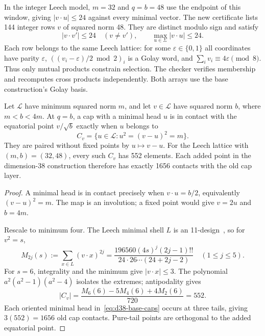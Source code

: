 In the integer Leech model, $m=32$ and $q=b=48$ use the endpoint of
this window, giving $|v\cdot u|\le24$ against every minimal vector.
The new certificate lists 144 integer rows $v$ of squared norm
48. They are distinct modulo sign and satisfy
\begin{equation}\label{eq:d38-witness}
 |v\cdot v'|\le24\quad(v\ne v'),\qquad
 \max_{u\in\Sigma}|v\cdot u|\le24.
\end{equation}
Each row belongs to the same Leech lattice: for some
$\varepsilon\in\{0,1\}$ all coordinates have parity $\varepsilon$,
$((v_i-\varepsilon)/2\bmod2)_i$ is a Golay word, and
$\sum_i v_i\equiv4\varepsilon\pmod8$.
Thus only mutual products constrain selection. The checker verifies
membership and recomputes cross products independently. Both arrays
use the base construction's Golay basis.

\begin{proposition}
\label{prop:shell-endpoint-contacts}
Let $\mathcal L$ have minimum squared norm $m$, and let $v\in\mathcal L$
have squared norm $b$, where $m<b<4m$. At $q=b$, a cap with a minimal
head $u$ is in contact with the equatorial point $v/\sqrt b$ exactly when
$u$ belongs to
\[
 C_v=\{u\in\mathcal L:u^2=(v-u)^2=m\}.
\]
They are paired without fixed points by $u\mapsto v-u$.
For the Leech lattice with $(m,b)=(32,48)$, every such $C_v$ has
552 elements. Each added point in the dimension-38 construction
therefore has exactly 1656 contacts with the old cap layer.
\end{proposition}
\begin{proof}
A minimal head is in contact precisely when $v\cdot u=b/2$,
equivalently $(v-u)^2=m$. The map is an involution; a fixed point
would give $v=2u$ and $b=4m$.

Rescale to minimum four. The Leech minimal shell $L$ is an
11-design~\cite[Theorem 4.1]{nebe-designs}, so for $v^2=s$,
\begin{equation}\label{eq:leech-shell-moments}
 M_{2j}(s):=\sum_{x\in L}(v\cdot x)^{2j}
 =\frac{196560(4s)^j(2j-1)!!}{24\cdot26\cdots(24+2j-2)}
 \quad(1\le j\le5).
\end{equation}
For $s=6$, integrality and the minimum give $|v\cdot x|\le3$.
The polynomial $a^2(a^2-1)(a^2-4)$ isolates the extremes; antipodality gives
\[
 |C_v|=\frac{M_6(6)-5M_4(6)+4M_2(6)}{720}=552.
\]
Each oriented minimal head in~\eqref{eq:d38-base-caps} occurs at
three tails, giving $3(552)=1656$ old cap contacts. Pure-tail points
are orthogonal to the added equatorial point.
\end{proof}

